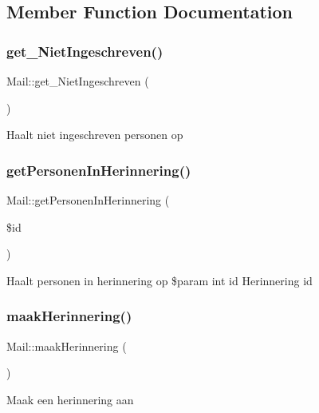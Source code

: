 \subsection{Member Function Documentation}
\mbox{\label{class_mail_a981094d50056d958426564d48c95cce1}} 
\subsubsection{\texorpdfstring{get\+\_\+\+Niet\+Ingeschreven()}{get\_NietIngeschreven()}}
{\footnotesize\ttfamily Mail\+::get\+\_\+\+Niet\+Ingeschreven (\begin{DoxyParamCaption}{ }\end{DoxyParamCaption})}

Haalt niet ingeschreven personen op \mbox{\label{class_mail_af56bb11351090ce865a284a2c27ef3bb}} 
\subsubsection{\texorpdfstring{get\+Personen\+In\+Herinnering()}{getPersonenInHerinnering()}}
{\footnotesize\ttfamily Mail\+::get\+Personen\+In\+Herinnering (\begin{DoxyParamCaption}\item[{}]{\$id }\end{DoxyParamCaption})}

Haalt personen in herinnering op \$param int id Herinnering id \mbox{\label{class_mail_a51675a2d0d65414634e3a21067462014}} 
\subsubsection{\texorpdfstring{maak\+Herinnering()}{maakHerinnering()}}
{\footnotesize\ttfamily Mail\+::maak\+Herinnering (\begin{DoxyParamCaption}{ }\end{DoxyParamCaption})}

Maak een herinnering aan \mbox{\label{class_mail_abb72118b34523cae188c03dc72955d8c}} 
